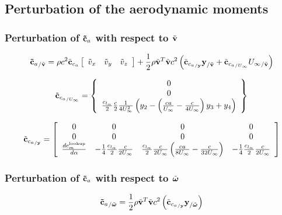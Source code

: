 \subsection{Perturbation of the aerodynamic moments}
\subsubsection{Perturbation of $\bm{\mathbf{\tilde{c}}}_a$ with respect to $\tilde{\bm{\mathbf{v}}}$}
		
\begin{equation}
{\bm{\mathbf{\tilde{c}}}_a}_{/\tilde{\bm{\mathbf{v}}}} = 
	\rho c^2 \tilde{\bm{\mathbf{c}}}_{c_{a}} \left[
		\begin{array}{ccc}
			\tilde{v}_x & \tilde{v}_y & \tilde{v}_z
		\end{array} \right] +
	\frac{1}{2} \rho \tilde{\bm{\mathbf{v}}}^T \tilde{\bm{\mathbf{v}}} c^2
	\left(  \tilde{\bm{\mathbf{c}}}_{{c_{a}}_{/\bm{\mathbf{y}}}} \bm{\mathbf{y}}_{/\tilde{\bm{\mathbf{v}}}} + 
	\tilde{\bm{\mathbf{c}}}_{{c_{a}}_{/U_{\infty}}} {U_\infty}_{/\tilde{\bm{\mathbf{v}}}}  \right) 
\end{equation}

\begin{equation}
\tilde{\bm{\mathbf{c}}}_{{c_{a}}_{/U_{\infty}}} = \left\{
	\begin{array}{c}
		0 \\
		0 \\
		\frac{c_{l_{\alpha}}}{2} \frac{c}{2} \frac{1}{4 U_\infty^2} 
		\left(  y_2 - \left(  \frac{c a}{U_\infty} - \frac{c}{4 U_\infty}  \right) y_3 +y_4 \right)
	\end{array} \right\}
\end{equation}

\begin{equation}
\tilde{\bm{\mathbf{c}}}_{{c_{a}}_{/\bm{\mathbf{y}}}} = \left[
	\begin{array}{cccc}
		0 & 0 & 0 & 0 \\
		0 & 0 & 0 & 0 \\
		\frac{ d c_m^{\text{lookup}}}{d \alpha} & 
			-\frac{1}{4} \frac{c_{l_{\alpha}}}{2} \frac{c}{2 U_\infty} &
			\frac{c_{l_{\alpha}}}{2} \frac{c}{2 U_\infty} \left(  \frac{c a}{8 U_\infty} -\frac{c}{32 U_\infty} \right) &
			-\frac{1}{4} \frac{c_{l_{\alpha}}}{2} \frac{c}{2 U_\infty} 
	\end{array} \right]
\end{equation}
\subsubsection{Perturbation of $\bm{\mathbf{\tilde{c}}}_a$ with respect to $\tilde{\bm{\mathbf{\omega}}}$}
\begin{equation}
{\bm{\mathbf{\tilde{c}}}_a}_{/\tilde{\bm{\mathbf{\omega}}}} = 
	\frac{1}{2} \rho \tilde{\bm{\mathbf{v}}}^T \tilde{\bm{\mathbf{v}}} c^2
	\left(  \tilde{\bm{\mathbf{c}}}_{{c_{a}}_{/\bm{\mathbf{y}}}} \bm{\mathbf{y}}_{/\tilde{\bm{\mathbf{\omega}}}}  \right) 
\end{equation}
